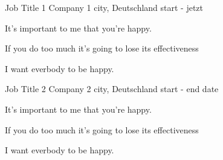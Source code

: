 

\begin{cventries}
  \cventry
    {Job Title 1 } %
    {Company 1} %
    {city, Deutschland} %
    {start - jetzt} %
    {
      \begin{cvitems} %
      	\item {It's important to me that you're happy.}
      	\item { If you do too much it's going to lose its effectiveness}
        \item {I want everbody to be happy.}
      \end{cvitems}
    }

  \cventry
    {Job Title 2 } %
    {Company 2} %
    {city, Deutschland} %
    {start - end date} %
    {
      \begin{cvitems} %
      	\item {It's important to me that you're happy.}
      	\item { If you do too much it's going to lose its effectiveness}
        \item {I want everbody to be happy.}
      \end{cvitems}
    }
	

\end{cventries}
